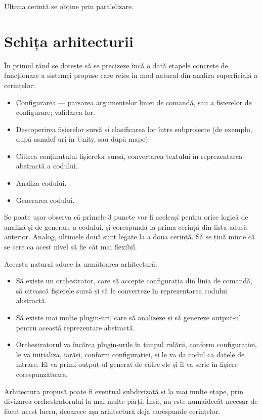 \documentclass[a4paper,12pt]{report}
\begin{document}
Ultima cerință se obține prin paralelizare.

\section{Schița arhitecturii}

În primul rând se dorește să se precizeze încă o dată etapele concrete de funcționare a sistemei propuse care reies în mod natural din analiza superficială a cerințelor:

\begin{itemize}
\item Configurarea --- parsarea argumentelor liniei de comandă, sau a fișierelor de configurare; validarea lor.
\item Descoperirea fișierelor sursă și clasificarea lor între subproiecte (de exemplu, după asmdef-uri în Unity, sau după mape).
\item Citirea conținutului fișierelor sursă, convertarea textului în reprezentarea abstractă a codului.
\item Analiza codului.
\item Generarea codului.
\end{itemize}

Se poate ușor observa că primele 3 puncte vor fi aceleași pentru orice logică de analiză și de generare a codului, și corespundă la prima cerință din lista adusă anterior.
Analog, ultimele două sunt legate la a doua cerință.
Să se țină minte că se cere ca acest nivel să fie cât mai flexibil.

Aceasta natural aduce la următoarea arhitectură:

\begin{itemize}
  \item Să existe un orchestrator, care să accepte configurația din linia de comandă, să citească fișierele sursă și să le converteze în reprezentarea codului abstractă.
  \item Să existe mai multe plugin-uri, care să analizeze și să genereze output-ul pentru această reprezentare abstractă.
  \item Orchestratorul va încărca plugin-urile în timpul rulării, conform configurației, le va inițializa, iarăși, conform configurației, și le va da codul ca datele de intrare. El va primi output-ul generat de către ele și îl va scrie în fișiere corespunzătoare.
\end{itemize}

Arhitectura propusă poate fi eventual subdivizată și la mai multe etape, prin divizarea orchestratorului la mai multe părți.
Însă, nu este numaidecât necesar de făcut acest lucru, deoarece așa arhitectură deja corespunde cerințelor.
\end{document}
